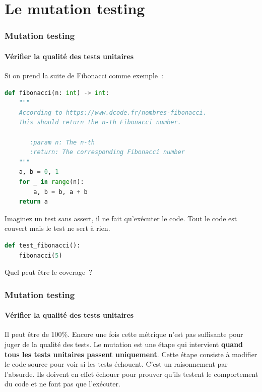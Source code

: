 \documentclass{beamer}
\begin{document}
    \section{Le mutation testing}\label{sec:mutation-testing}

    \begin{frame}[fragile]
        \frametitle{Mutation testing}
        \framesubtitle{Vérifier la qualité des tests unitaires}
        \transdissolve
        Si on prend la suite de Fibonacci comme exemple~:
        \begin{lstlisting}[language=Python,basicstyle=\ttfamily\tiny]
def fibonacci(n: int) -> int:
    """
    According to https://www.dcode.fr/nombres-fibonacci.
    This should return the n-th Fibonacci number.

       :param n: The n-th
       :return: The corresponding Fibonacci number
    """
    a, b = 0, 1
    for _ in range(n):
        a, b = b, a + b
    return a
        \end{lstlisting}
        Imaginez un test sans assert, il ne fait qu'exécuter le code.
        Tout le code est couvert mais le test ne sert à rien.
        \begin{lstlisting}[language=Python]
def test_fibonacci():
    fibonacci(5)
        \end{lstlisting}
        Quel peut être le coverage~?
    \end{frame}

    \begin{frame}[fragile]
        \frametitle{Mutation testing}
        \framesubtitle{Vérifier la qualité des tests unitaires}
        Il peut être de 100\%.
        Encore une fois cette métrique n'est pas suffisante pour juger de la qualité des tests.
        \bigbreak
        Le mutation est une étape qui intervient \textbf{quand tous les tests unitaires passent uniquement}.
        Cette étape consiste à modifier le code source pour voir si les tests échouent.
        C'est un raisonnement par l'absurde.
        Ils doivent en effet échouer pour prouver qu'ils testent le comportement du code et ne font pas que l'exécuter.
    \end{frame}
\end{document}
